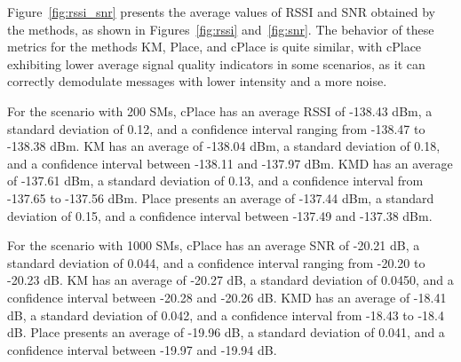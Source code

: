 \documentclass[a4paper,fleqn]{cas-dc}
\begin{document}
Figure~\ref{fig:rssi_snr} presents the average values of \gls{RSSI} and \gls{SNR} obtained by the methods, as shown in Figures~\ref{fig:rssi} and~\ref{fig:snr}. The behavior of these metrics for the methods KM, Place, and cPlace is quite similar, with cPlace exhibiting lower average signal quality indicators in some scenarios, as it can correctly demodulate messages with lower intensity and a more noise.

For the scenario with 200 \gls{SMs}, cPlace has an average RSSI of -138.43 dBm, a standard deviation of 0.12, and a confidence interval ranging from -138.47 to -138.38 dBm. KM has an average of -138.04 dBm, a standard deviation of 0.18, and a confidence interval between -138.11 and -137.97 dBm. KMD has an average of -137.61 dBm, a standard deviation of 0.13, and a confidence interval from -137.65 to -137.56 dBm. Place presents an average of -137.44 dBm, a standard deviation of 0.15, and a confidence interval between -137.49 and -137.38 dBm.

For the scenario with 1000 \gls{SMs}, cPlace has an average SNR of -20.21 dB, a standard deviation of 0.044, and a confidence interval ranging from -20.20 to -20.23 dB. KM has an average of -20.27 dB, a standard deviation of 0.0450, and a confidence interval between -20.28 and -20.26 dB. KMD has an average of -18.41 dB, a standard deviation of 0.042, and a confidence interval from -18.43 to -18.4 dB. Place presents an average of -19.96 dB, a standard deviation of 0.041, and a confidence interval between -19.97 and -19.94 dB.
\end{document}
